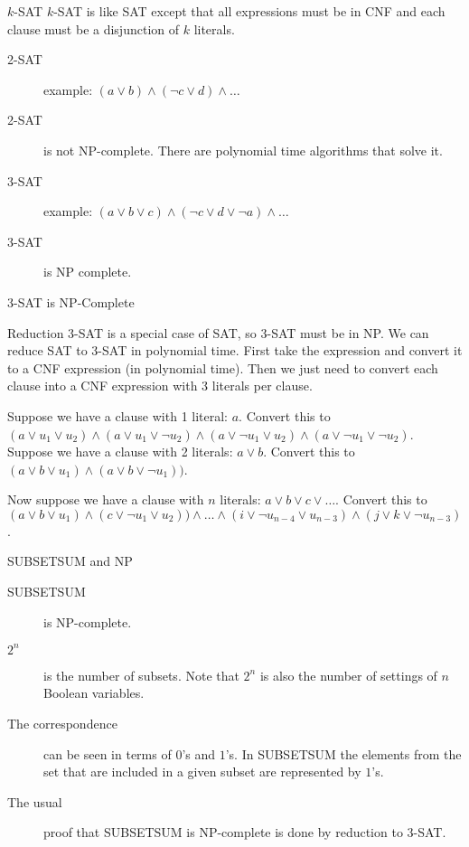\begin{frame}{$k$-SAT}
  $k$-SAT is like SAT except that all expressions must be in CNF and each clause must be a disjunction of $k$ literals.

  \vspace{2mm}

  \begin{description}
    \item[2-SAT] example: $(a \lor b) \land (\neg c \lor d) \land \ldots$
    \item[2-SAT] is not NP-complete. There are polynomial time algorithms that solve it.
    \item[3-SAT] example: $(a \lor b \lor c) \land (\neg c \lor d \lor \neg a) \land \ldots$
    \item[3-SAT] is NP complete.
  \end{description}
\end{frame}


\begin{frame}{3-SAT is NP-Complete}

  \begin{alertblock}{Reduction}
    3-SAT is a special case of SAT, so 3-SAT must be in NP.
    We can reduce SAT to 3-SAT in polynomial time.
    First take the expression and convert it to a CNF expression (in polynomial time).
    Then we just need to convert each clause into a CNF expression with 3 literals per clause.
    
    Suppose we have a clause with 1 literal: $a$.
    Convert this to $(a \lor u_1 \lor u_2) \land (a \lor u_1 \lor \neg u_2) \land (a \lor \neg u_1 \lor u_2) \land (a \lor \neg u_1 \lor \neg u_2)$.
    Suppose we have a clause with 2 literals: $a \lor b$.
    Convert this to $(a \lor b \lor u_1) \land (a \lor b \lor \neg u_1))$.
    
    Now suppose we have a clause with $n$ literals: $a \lor b \lor c \lor \ldots$.
    Convert this to $(a \lor b \lor u_1) \land (c \lor \neg u_1 \lor u_2)) \land \ldots \land (i \lor \neg u_{n-4} \lor u_{n-3}) \land (j \lor k \lor \neg u_{n-3})$.
  \end{alertblock}

\end{frame}


\begin{frame}{SUBSETSUM and NP}
  \begin{description}
    \item[SUBSETSUM] is NP-complete.
    \item[$2^n$] is the number of subsets. Note that $2^n$ is also the number of settings of $n$ Boolean variables.
    \item[The correspondence] can be seen in terms of $0$'s and $1$'s. In SUBSETSUM the elements from the set that are included in a given subset are represented by $1$'s.
    \item[The usual] proof that SUBSETSUM is NP-complete is done by reduction to 3-SAT.
  \end{description}
\end{frame}